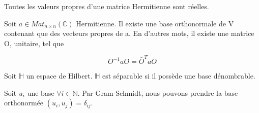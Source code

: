 \documentclass[../notesdecours.tex]{subfiles}
\begin{document}
\begin{lemma} Toutes les valeurs propres d'une matrice Hermitienne sont réelles. \end{lemma}


\begin{theorem} Soit $a \in Mat_{n \times n} (\mathbb{C})$ Hermitienne. Il existe une base orthonormale de V contenant que des vecteurs propres de a. En d'autres mots, il existe une matrice O, unitaire, tel que

\begin{equation}
O^{-1}aO = \bar{O}^TaO
\end{equation}
\end{theorem}

\begin{definition}
Soit $\mathbb{H}$ un espace de Hilbert. $\mathbb{H}$ est séparable si il possède une base dénombrable. 
\end{definition}

\begin{remark}
Soit $u_i$ une base $\forall i\in\mathbb{N}$. Par Gram-Schmidt, nous pouvons prendre la base orthonormée $(u_i,u_j) = \delta_{ij}$.
\end{remark}





\end{document}
